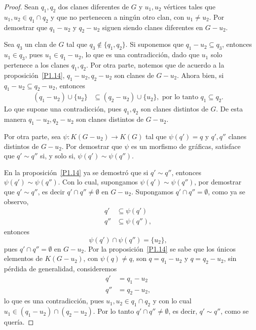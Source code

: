 \documentclass[12pt]{book}
\theoremstyle{definition}
\begin{document}
\begin{proof}
Sean $q_1,q_2$ dos clanes diferentes de $G$ y $u_1,u_2$ vértices tales que $u_1,u_2\in q_1\cap q_2$ y que no pertenecen a ningún otro clan, con $u_1\neq u_2$. Por demostrar que $q_1-u_2$ y $q_2-u_2$ siguen siendo clanes diferentes en $G-u_2$.

Sea $q_3$ un clan de $G$ tal que $q_3\notin \{q_1,q_2\}$. Si suponemos que $q_1-u_2\subseteq q_3$, entonces $u_1\in q_3$, pues $u_1 \in q_1-u_2$, lo que es una contradicción, dado que $u_1$ solo pertenece a los clanes $q_1,q_2$. Por otra parte, notemos que de acuerdo a la proposición~\ref{P1.14}, $q_1-u_2,q_2-u_2$ son clanes de $G-u_2$. Ahora bien, si $q_1-u_2\subseteq q_2-u_2$, entonces 
\begin{equation*}
\begin{aligned}
(q_1-u_2)\cup\{u_2\} &\subseteq (q_2-u_2)\cup\{u_2\},\text{ por lo tanto }
q_1 \subseteq q_2.
\end{aligned}
\end{equation*}
Lo que supone una contradicción, pues $q_1,q_2$ son clanes distintos de $G$. De esta manera $q_1-u_2,q_2-u_2$ son clanes distintos de $G-u_2$.

Por otra parte, sea $\psi:K(G-u_2)\to K(G)$ tal que $\psi(q')=q$ y $q',q''$ clanes distintos de $G-u_2$. Por demostrar que $\psi$ es un morfismo de gráficas, satisface que $q'\sim q''$ si, y solo si, $\psi(q')\sim\psi(q'')$.

En la proposición~\ref{P1.14} ya se demostró que si $q'\sim q''$, entonces $\psi(q')\sim\psi(q'')$. Con lo cual, supongamos $\psi(q')\sim\psi(q'')$, por demostrar que $q'\sim q''$, es decir $q'\cap q''\neq\emptyset$ en $G-u_2$. Supongamos $q'\cap q''=\emptyset$, como ya se observo,
\begin{equation*}
\begin{aligned}
q' &\subseteq \psi(q') \\
q'' &\subseteq \psi(q''),
\end{aligned}
\end{equation*}
entonces
\begin{equation*}
\psi(q')\cap \psi(q'')=\{u_2\},
\end{equation*}
pues $q'\cap q''=\emptyset$ en $G-u_2$. Por la proposición~\ref{P1.14} se sabe que los únicos elementos de $K(G-u_2)$, con $\psi(q)\neq q$, son $q=q_1-u_2$ y $q=q_2-u_2$, sin pérdida de generalidad, consideremos 
\begin{equation*}
\begin{aligned}
q' &= q_1-u_2 \\
q'' &= q_2-u_2,
\end{aligned}
\end{equation*}
lo que es una contradicción, pues $u_1,u_2\in q_1\cap q_2$ y con lo cual $u_1\in (q_1-u_2)\cap (q_2-u_2)$. Por lo tanto $q'\cap q''\neq\emptyset$, es decir, $q'\sim q''$, como se quería.


\end{proof}
\end{document}
